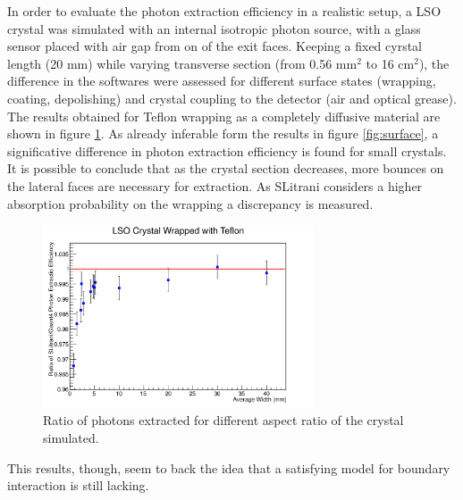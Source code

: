 In order to evaluate the photon extraction efficiency in a realistic setup, a LSO crystal was simulated with an internal isotropic photon source, with a glass sensor placed with air gap from on of the exit faces.
Keeping a fixed cyrstal length (20 mm) while varying transverse section (from 0.56 mm$^{2}$ to 16 cm$^{2}$), the difference in the softwares were assessed for different surface states (wrapping, coating, depolishing) and crystal coupling to the detector (air and optical grease).
The results obtained for Teflon wrapping as a completely diffusive material are shown in figure \ref{fig:dimensions}.
As already inferable form the results in figure \ref{fig:surface}, a significative difference in photon extraction efficiency is found for small crystals.
It is possible to conclude that as the crystal section decreases, more bounces on the lateral faces are necessary for extraction. As SLitrani considers a higher absorption probability on the wrapping a discrepancy is measured.
\begin{figure}[htbp]
\begin{center}
\includegraphics[width=8cm]{../Pictures/Chapter_5/size_LY_variation.png}
\end{center}
\caption[Geant4 SLitrani size ratio variation]{Ratio of photons extracted for different aspect ratio of the crystal simulated.}
\label{fig:dimensions}
\end{figure}
This results, though, seem to back the idea that a satisfying model for boundary interaction is still lacking. 

